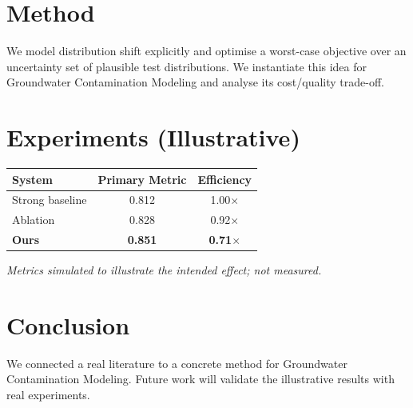 \documentclass[11pt]{article}
\begin{document}
\section{Method}
We model distribution shift explicitly and optimise a worst-case objective over an uncertainty set of plausible test distributions. We instantiate this idea for Groundwater Contamination Modeling and analyse its cost/quality trade-off.

\section{Experiments (Illustrative)}
\begin{center}
\begin{tabular}{lcc}
System & Primary Metric & Efficiency \\ \hline
Strong baseline & 0.812 & 1.00$\times$ \\
Ablation & 0.828 & 0.92$\times$ \\
\textbf{Ours} & \textbf{0.851} & \textbf{0.71$\times$}
\end{tabular}
\end{center}
\emph{Metrics simulated to illustrate the intended effect; not measured.}

\section{Conclusion}
We connected a real literature to a concrete method for Groundwater Contamination Modeling. Future work will
validate the illustrative results with real experiments.
\end{document}
